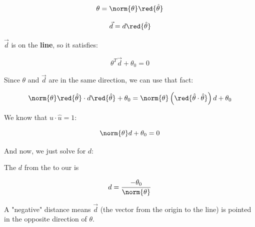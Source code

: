         \begin{equation}
            \theta = \norm{\theta} \red{\hat{\theta}}
        \end{equation}
        
        \begin{equation*}
            \vec{d} = d \red{\hat{\theta}}
        \end{equation*}
        
        $\vec{d}$ is on the \textbf{line}, so it satisfies:
        
        \begin{equation}
            \theta^T \vec{d} + \theta_0=0
        \end{equation}
        
        Since $\theta$ and $\vec{d}$ are in the same direction, we can use that fact:
        
        \begin{equation}
            \norm{\theta} 
            \red{\hat{\theta}} \cdot d \red{\hat{\theta}}
            + \theta_0
            = 
            \norm{\theta} \left( 
                                \red{\hat{\theta} \cdot \hat{\theta}} 
                          \right) 
                          d + \theta_0
        \end{equation}
        
        We know that $\hat{u} \cdot \hat{u}=1$:
        
        \begin{equation}
            \norm{\theta}d+\theta_0=0
        \end{equation}
        
        And now, we just solve for $d$:\\
        
        \begin{concept}
            The  $d$ from the  to our  is 
            
            \begin{equation}
                d = \frac{ -\theta_0}{\norm{\theta}}
            \end{equation}
        \end{concept}
        
        A "negative" distance means $\vec{d}$ (the vector from the origin to the line) is pointed in the opposite direction of $\theta$.
        
